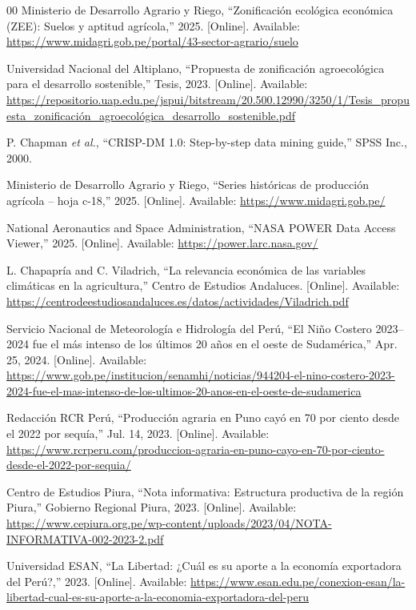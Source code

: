 \documentclass[conference]{IEEEtran}
\begin{document}
\begin{thebibliography}{00}
 Ministerio de Desarrollo Agrario y Riego, ``Zonificación ecológica económica (ZEE): Suelos y aptitud agrícola,'' 2025. [Online]. Available: \url{https://www.midagri.gob.pe/portal/43-sector-agrario/suelo} 

 Universidad Nacional del Altiplano, ``Propuesta de zonificación agroecológica para el desarrollo sostenible,'' Tesis, 2023. [Online]. Available: \url{https://repositorio.uap.edu.pe/jspui/bitstream/20.500.12990/3250/1/Tesis_propuesta_zonificación_agroecológica_desarrollo_sostenible.pdf} 

P. Chapman \textit{et al.}, ``CRISP-DM 1.0: Step-by-step data mining guide,'' SPSS Inc., 2000.

Ministerio de Desarrollo Agrario y Riego, ``Series históricas de producción agrícola -- hoja c-18,'' 2025. [Online]. Available: \url{https://www.midagri.gob.pe/}

National Aeronautics and Space Administration, ``NASA POWER Data Access Viewer,'' 2025. [Online]. Available: \url{https://power.larc.nasa.gov/}

L. Chapapría and C. Viladrich, ``La relevancia económica de las variables climáticas en la agricultura,'' Centro de Estudios Andaluces. [Online]. Available: \url{https://centrodeestudiosandaluces.es/datos/actividades/Viladrich.pdf}

Servicio Nacional de Meteorología e Hidrología del Perú, ``El Niño Costero 2023--2024 fue el más intenso de los últimos 20 años en el oeste de Sudamérica,'' Apr. 25, 2024. [Online]. Available: \url{https://www.gob.pe/institucion/senamhi/noticias/944204-el-nino-costero-2023-2024-fue-el-mas-intenso-de-los-ultimos-20-anos-en-el-oeste-de-sudamerica}

Redacción RCR Perú, ``Producción agraria en Puno cayó en 70 por ciento desde el 2022 por sequía,'' Jul. 14, 2023. [Online]. Available: \url{https://www.rcrperu.com/produccion-agraria-en-puno-cayo-en-70-por-ciento-desde-el-2022-por-sequia/}

Centro de Estudios Piura, ``Nota informativa: Estructura productiva de la región Piura,'' Gobierno Regional Piura, 2023. [Online]. Available: \url{https://www.cepiura.org.pe/wp-content/uploads/2023/04/NOTA-INFORMATIVA-002-2023-2.pdf}

Universidad ESAN, ``La Libertad: ¿Cuál es su aporte a la economía exportadora del Perú?,'' 2023. [Online]. Available: \url{https://www.esan.edu.pe/conexion-esan/la-libertad-cual-es-su-aporte-a-la-economia-exportadora-del-peru}


\end{thebibliography}
\end{document}
